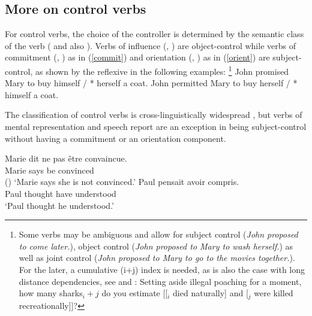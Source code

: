 \subsection{More on control verbs}

For control verbs, the choice of the controller is determined by the semantic class of the verb
(\citealt[Chapter~3]{PollardandSag1992} and also \citealt{JackendoffandCulicover2003}).  Verbs of
influence (, ) are object-control while verbs of commitment
(, ) as in (\ref{commit}) and orientation (, ) as in
(\ref{orient}) are subject-control, as shown by the reflexive in the following examples:%
\footnote{Some verbs may be ambiguous and allow for subject control (\emph{John proposed to come
    later.}), object control (\emph{John proposed to Mary to wash herself.}) as well as joint
  control (\emph{John proposed to Mary to go to the movies together.}). For the later, a cumulative
  (i+j) index is needed, as is also the case with long distance dependencies, see
   and
  \crossrefchapterw[\pageref{ex:UDC:31}]{udc}:
\ea
Setting aside illegal poaching for a moment, how many sharks$_i+j$ do you estimate [[$_i$ died
naturally] and [$_j$ were killed recreationally]]?
\zlast
}
\eal
\ex\label{ex-John-promised-Mary-to-buy}
John promised Mary to buy himself / * herself a coat. \label{commit}
\ex\label{ex-John-permitted-Mary-to-buy} 
John permitted Mary to buy herself / * himself a coat.\label{orient}
\zl
 
  The classification of control verbs is cross-linguistically widespread \citep{VanValinandLapolla1997}, but  verbs of mental representation and speech report are an exception in being subject-control without having a commitment or an orientation component.


\begin{exe}
\ex \begin{xlist}
\ex 
\gll Marie dit {ne pas} \^etre convaincue.\\
     Marie says  be convinced \\\hfill()
\glt `Marie says she is not convinced.'	
\ex 
\gll Paul pensait  avoir compris. \\
     Paul thought have understood \\
\glt `Paul thought he understood.'
 \end{xlist}
\end{exe}

